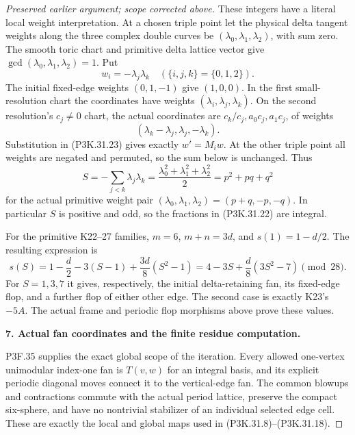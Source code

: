 \begin{proof}[Preserved earlier argument; scope corrected above]
These integers have a literal local weight interpretation.
At a chosen triple point let the physical delta tangent
weights along the three complex double curves be
\((\lambda_0,\lambda_1,\lambda_2)\), with sum zero.
The smooth toric chart and primitive delta lattice vector
give \(\gcd(\lambda_0,\lambda_1,\lambda_2)=1\).
Put
\[
              w_i=-\lambda_j\lambda_k\quad
                     (\{i,j,k\}=\{0,1,2\}).
                                                        \tag{P3K.31.23}
\]
The initial fixed-edge weights \((0,1,-1)\) give
\((1,0,0)\). In the first small-resolution chart the
coordinates have weights \((\lambda_i,\lambda_j,\lambda_k)\).
On the second resolution's \(c_j\ne0\) chart, the actual
coordinates are \(c_k/c_j,a_0c_j,a_1c_j\), of weights
\[
                  (\lambda_k-\lambda_j,\lambda_j,-\lambda_k).
                                                        \tag{P3K.31.24}
\]
Substitution in (P3K.31.23) gives exactly \(w'=M_iw\).
At the other triple point all weights are negated and
permuted, so the sum below is unchanged. Thus
\[
             S=-\sum_{j<k}\lambda_j\lambda_k
               =\frac{\lambda_0^2+\lambda_1^2+\lambda_2^2}{2}
               =p^2+pq+q^2
                                                        \tag{P3K.31.25}
\]
for the actual primitive weight pair
\((\lambda_0,\lambda_1,\lambda_2)=(p+q,-p,-q)\).
In particular \(S\) is positive and odd, so the fractions
in (P3K.31.22) are integral.

For the primitive K22--27 families, \(m=6\), \(m+n=3d\),
and \(s(1)=1-d/2\). The resulting expression is
\[
        s(S)=1-\frac d2-3(S-1)+\frac{3d}{8}(S^2-1)
             =4-3S+\frac d8(3S^2-7)\pmod{28}.
                                                        \tag{P3K.31.26}
\]
For \(S=1,3,7\) it gives, respectively, the initial
delta-retaining fan, its fixed-edge flop, and a further
flop of either other edge. The second case is exactly
K23's \(-5A\). The actual frame and periodic flop morphisms above prove these values.

\par\medskip\noindent\textbf{7. Actual fan coordinates and the finite residue computation.}\enspace

P3F.35 supplies the exact global scope of the iteration.
Every allowed one-vertex unimodular index-one fan is
\(T(v,w)\) for an integral basis, and its explicit
periodic diagonal moves connect it to the vertical-edge
fan. The common blowups and contractions commute with
the actual period lattice, preserve the compact
six-sphere, and have no nontrivial stabilizer of an
individual selected edge cell. These are exactly the
local and global maps used in (P3K.31.8)--(P3K.31.18).


\end{proof}
